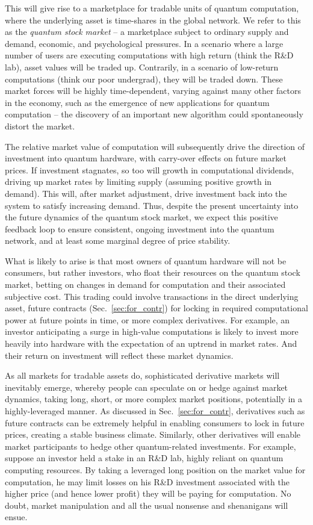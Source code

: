 This will give rise to a marketplace for tradable units of quantum computation, where the underlying asset is time-shares in the global network. We refer to this as the \textit{quantum stock market} -- a marketplace subject to ordinary supply and demand, economic, and psychological pressures. In a scenario where a large number of users are executing computations with high return (think the R\&D lab), asset values will be traded up. Contrarily, in a scenario of low-return computations (think our poor undergrad), they will be traded down. These market forces will be highly time-dependent, varying against many other factors in the economy, such as the emergence of new applications for quantum computation -- the discovery of an important new algorithm could spontaneously distort the market.

The relative market value of computation will subsequently drive the direction of investment into quantum hardware, with carry-over effects on future market prices. If investment stagnates, so too will growth in computational dividends, driving up market rates by limiting supply (assuming positive growth in demand). This will, after market adjustment, drive investment back into the system to satisfy increasing demand. Thus, despite the present uncertainty into the future dynamics of the quantum stock market, we expect this positive feedback loop to ensure consistent, ongoing investment into the quantum network, and at least some marginal degree of price stability.

What is likely to arise is that most owners of quantum hardware will not be consumers, but rather investors, who float their resources on the quantum stock market, betting on changes in demand for computation and their associated subjective cost. This trading could involve transactions in the direct underlying asset, future contracts (Sec.~\ref{sec:for_contr}) for locking in required computational power at future points in time, or more complex derivatives. For example, an investor anticipating a surge in high-value computations is likely to invest more heavily into hardware with the expectation of an uptrend in market rates. And their return on investment will reflect these market dynamics.

As all markets for tradable assets do, sophisticated derivative markets will inevitably emerge, whereby people can speculate on or hedge against market dynamics, taking long, short, or more complex market positions, potentially in a highly-leveraged manner. As discussed in Sec.~\ref{sec:for_contr}, derivatives such as future contracts can be extremely helpful in enabling consumers to lock in future prices, creating a stable business climate. Similarly, other derivatives will enable market participants to hedge other quantum-related investments. For example, suppose an investor held a stake in an R\&D lab, highly reliant on quantum computing resources. By taking a leveraged long position on the market value for computation, he may limit losses on his R\&D investment associated with the higher price (and hence lower profit) they will be paying for computation. No doubt, market manipulation and all the usual nonsense and shenanigans will ensue.

